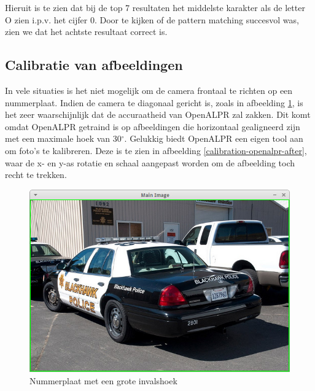 Hieruit is te zien dat bij de top 7 resultaten het middelste karakter als de letter O zien i.p.v. het cijfer 0. Door te kijken of de pattern matching succesvol was, zien we dat het achtste resultaat correct is.

\subsection{Calibratie van afbeeldingen}
In vele situaties is het niet mogelijk om de camera frontaal te richten op een nummerplaat. Indien de camera te diagonaal gericht is, zoals in afbeelding \ref{calibration-openalpr}, is het zeer waarschijnlijk dat de accuraatheid van OpenALPR zal zakken. Dit komt omdat OpenALPR getraind is op afbeeldingen die horizontaal gealigneerd zijn met een maximale hoek van 30$^{\circ}$. Gelukkig biedt OpenALPR een eigen tool aan om foto's te kalibreren. Deze is te zien in afbeelding \ref{calibration-openalpr-after}, waar de x- en y-as rotatie en schaal aangepast worden om de afbeelding toch recht te trekken.

\begin{figure}[h!]
	\centering
	\includegraphics[width=0.7\linewidth]{img/calibration/configuration_calibration_before.jpg}
	\caption{Nummerplaat met een grote invalshoek \autocite{openalpr2015pattern}}
	\label{calibration-openalpr}
\end{figure}

